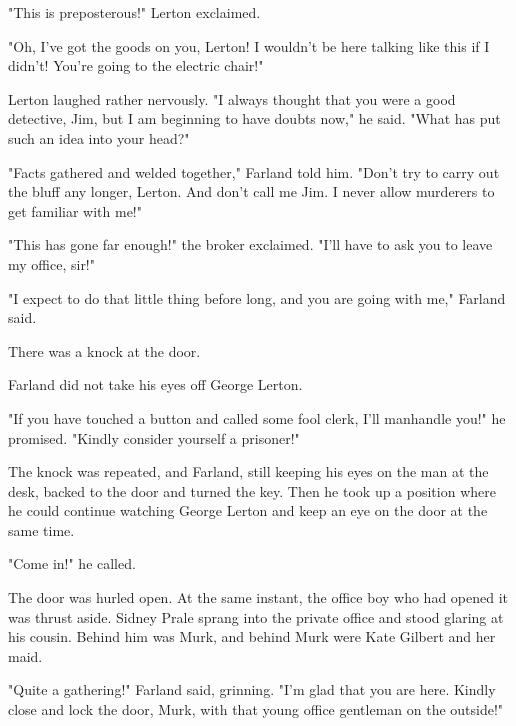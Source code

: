 \documentclass{novel}
\begin{document}
"This is preposterous!" Lerton exclaimed.

"Oh, I've got the goods on you, Lerton! I wouldn't be here talking like this if I didn't! You're going to the electric chair!"

Lerton laughed rather nervously. "I always thought that you were a good detective, Jim, but I am beginning to have doubts now," he said. "What has put such an idea into your head?"

"Facts gathered and welded together," Farland told him. "Don't try to carry out the bluff any longer, Lerton. And don't call me Jim. I never allow murderers to get familiar with me!"

"This has gone far enough!" the broker exclaimed. "I'll have to ask you to leave my office, sir!"

"I expect to do that little thing before long, and you are going with me," Farland said.

There was a knock at the door.

\vspace{2\nbs}
\clearpage
\thispagestyle{empty}

\begin{ChapterStart}
\vspace{3\nbs}
\end{ChapterStart}
    
Farland did not take his eyes off George Lerton.

"If you have touched a button and called some fool clerk, I'll manhandle you!" he promised. "Kindly consider yourself a prisoner!"

The knock was repeated, and Farland, still keeping his eyes on the man at the desk, backed to the door and turned the key. Then he took up a position where he could continue watching George Lerton and keep an eye on the door at the same time.

"Come in!" he called.

The door was hurled open. At the same instant, the office boy who had opened it was thrust aside. Sidney Prale sprang into the private office and stood glaring at his cousin. Behind him was Murk, and behind Murk were Kate Gilbert and her maid.

"Quite a gathering!" Farland said, grinning. "I'm glad that you are here. Kindly close and lock the door, Murk, with that young office gentleman on the outside!"
\end{document}
